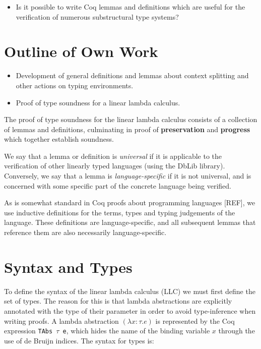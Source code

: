 \documentclass[]{unswthesis}
\let\c\texttt
\let\i\textit
\begin{document}
\begin{itemize}
\item Is it possible to write Coq lemmas and definitions which are useful for the verification of numerous substructural type systems?
\end{itemize}



\section{Outline of Own Work}

\begin{itemize}
\item Development of general definitions and lemmas about context splitting and other actions on typing environments.
\item Proof of type soundness for a linear lambda calculus.
\end{itemize}

The proof of type soundness for the linear lambda calculus consists of a collection of lemmas and definitions, culminating in proof of \textbf{preservation} and \textbf{progress} which together establish soundness.

We say that a lemma or definition is \i{universal} if it is applicable to the verification of other linearly typed languages (using the DbLib library). Conversely, we say that a lemma is \i{language-specific} if it is not universal, and is concerned with some specific part of the concrete language being verified.

As is somewhat standard in Coq proofs about programming languages [REF], we use inductive definitions for the terms, types and typing judgements of the language. These definitions are language-specific, and all subsequent lemmas that reference them are also necessarily language-specific.


\section{Syntax and Types}

To define the syntax of the linear lambda calculus (LLC) we must first define the set of types. The reason for this is that lambda abstractions are explicitly annotated with the type of their parameter in order to avoid type-inference when writing proofs. A lambda abstraction $(\lambda x : \tau. e)$ is represented by the Coq expression \c{TAbs $\tau$ e}, which hides the name of the binding variable $x$ through the use of de Bruijn indices. The syntax for types is:
\end{document}
